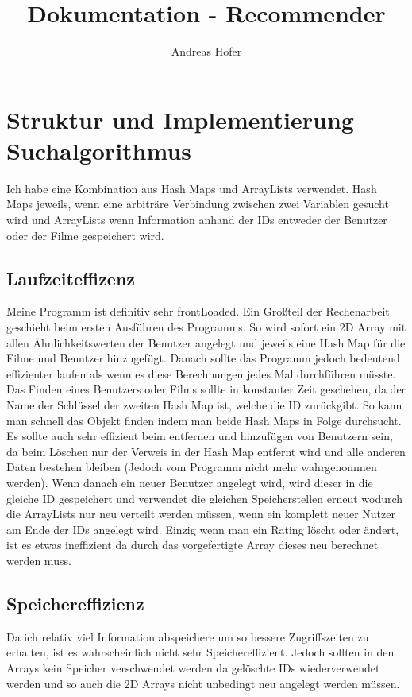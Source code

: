 \documentclass{article}
\title{\vspace{-1cm}Dokumentation - Recommender}
\author{Andreas Hofer}
\begin{document}
	\maketitle
	\section{Struktur und Implementierung Suchalgorithmus}
	Ich habe eine Kombination aus Hash Maps und ArrayLists verwendet. Hash Maps jeweils, wenn eine arbiträre Verbindung zwischen zwei Variablen gesucht wird und ArrayLists wenn Information anhand der IDs entweder der Benutzer oder der Filme gespeichert wird.
	\subsection{Laufzeiteffizenz}
	Meine Programm ist definitiv sehr frontLoaded. Ein Großteil der Rechenarbeit geschieht beim ersten Ausführen des Programms. So wird sofort ein 2D Array mit allen Ähnlichkeitswerten der Benutzer angelegt und jeweils eine Hash Map für die Filme und Benutzer hinzugefügt. Danach sollte das Programm jedoch bedeutend effizienter laufen als wenn es diese Berechnungen jedes Mal durchführen müsste. Das Finden eines Benutzers oder Films sollte in konstanter Zeit geschehen, da der Name der Schlüssel der zweiten Hash Map ist, welche die ID zurückgibt. So kann man schnell das Objekt finden indem man beide Hash Maps in Folge durchsucht. Es sollte auch sehr effizient beim entfernen und hinzufügen von Benutzern sein, da beim Löschen nur der Verweis in der Hash Map entfernt wird und alle anderen Daten bestehen bleiben (Jedoch vom Programm nicht mehr wahrgenommen werden). Wenn danach ein neuer Benutzer angelegt wird, wird dieser in die gleiche ID gespeichert und verwendet die gleichen Speicherstellen erneut wodurch die ArrayLists nur neu verteilt werden müssen, wenn ein komplett neuer Nutzer am Ende der IDs angelegt wird. Einzig wenn man ein Rating löscht oder ändert, ist es etwas ineffizient da durch das vorgefertigte Array dieses neu berechnet werden muss.
	\subsection{Speichereffizienz}
	Da ich relativ viel Information abspeichere um so bessere Zugriffszeiten zu erhalten, ist es wahrscheinlich nicht sehr Speichereffizient. Jedoch sollten in den Arrays kein Speicher verschwendet werden da gelöschte IDs wiederverwendet werden und so auch die 2D Arrays nicht unbedingt neu angelegt werden müssen.
\end{document}
